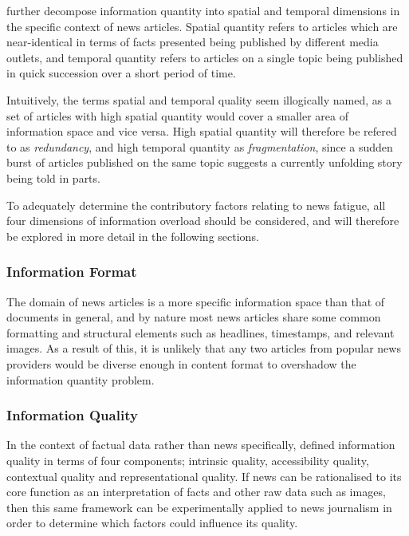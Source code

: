 \citet{GuestEditorsIntroductionInformationOverload} further decompose information quantity into spatial and temporal dimensions in the specific context of news articles. Spatial quantity refers to articles which are near-identical in terms of facts presented being published by different media outlets, and temporal quantity refers to articles on a single topic being published in quick succession over a short period of time. 

Intuitively, the terms spatial and temporal quality seem illogically named, as a set of articles with high spatial quantity would cover a smaller area of information space and vice versa. High spatial quantity will therefore be refered to as \textit{redundancy}, and high temporal quantity as \textit{fragmentation}, since a sudden burst of articles published on the same topic suggests a currently unfolding story being told in parts.

To adequately determine the contributory factors relating to news fatigue, all four dimensions of information overload should be considered, and will therefore be explored in more detail in the following sections.

\subsubsection{Information Format}
The domain of news articles is a more specific information space than that of documents in general, and by nature most news articles share some common formatting and structural elements such as headlines, timestamps, and relevant images. As a result of this, it is unlikely that any two articles from popular news providers would be diverse enough in content format to overshadow the information quantity problem.

\subsubsection{Information Quality}
In the context of factual data rather than news specifically, \citet{DataQualityInContext} defined information quality in terms of four components; intrinsic quality, accessibility quality, contextual quality and representational quality. If news can be rationalised to its core function as an interpretation of facts and other raw data such as images, then this same framework can be experimentally applied to news journalism in order to determine which factors could influence its quality.

